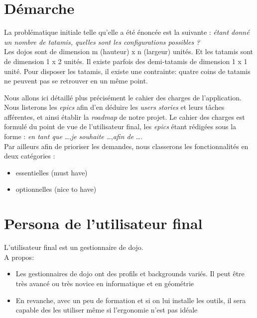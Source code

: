 \section{Démarche}

La problématique initiale telle qu'elle a été énoncée est la suivante : \emph{étant donné un nombre de tatamis, quelles sont les 
configurations possibles ?}\\

Les dojos sont de dimension m (hauteur) x n (largeur) unités. Et les tatamis sont de dimension 1 x 2 unités. Il existe parfois des demi-tatamis de dimension 1 x 1 unité.
Pour disposer les tatamis, il existe une contrainte: quatre coins de tatamis ne peuvent pas se retrouver en un même point.

Nous allons ici détaillé plus précisément le cahier des charges de l'application. Nous listerons les \emph{epics} afin d'en déduire
les \emph{users stories} et leurs tâches afférentes, et ainsi établir la \emph{roadmap} de notre projet. Le cahier des charges est formulé 
du point de vue de l'utilisateur final, les \emph{epics} étant rédigées sous la forme : \emph{en tant que} \dots ,\emph{je souhaite} \dots ,\emph{afin de } \dots.\\


Par ailleurs afin de prioriser les demandes, nous classerons les fonctionnalités en deux catégories :

\begin{itemize}
    \item essentielles (must have)
    \item optionnelles (nice to have)
\end{itemize}

\section{Persona de l’utilisateur final}

L’utilisateur final est un gestionnaire de dojo.\\

A propos:
\begin{itemize}
    \item Les gestionnaires de dojo ont des profils et backgrounds variés. Il peut être très avancé 
    ou très novice en informatique et en géométrie
    \item En revanche, avec un peu de formation et si on lui installe les outils, il sera capable 
    des les utiliser même si l’ergonomie n’est pas idéale
\end{itemize}


